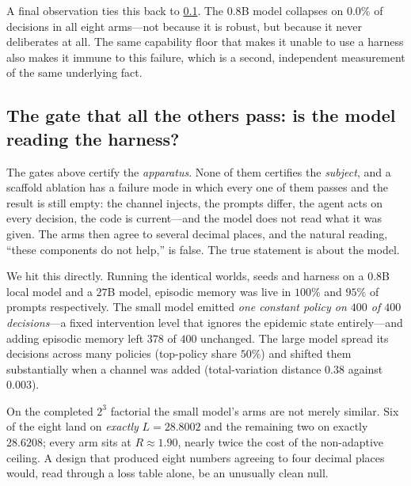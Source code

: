 \documentclass[11pt]{article}
\begin{document}
A final observation ties this back to \cref{sec:responsiveness}. The $0.8$B model collapses on
$0.0\%$ of decisions in all eight arms---not because it is robust, but because it never deliberates
at all. The same capability floor that makes it unable to use a harness also makes it immune to this
failure, which is a second, independent measurement of the same underlying fact.

\subsection{The gate that all the others pass: is the model reading the harness?}
\label{sec:responsiveness}

The gates above certify the \emph{apparatus}. None of them certifies the \emph{subject}, and a
scaffold ablation has a failure mode in which every one of them passes and the result is still empty:
the channel injects, the prompts differ, the agent acts on every decision, the code is current---and
the model does not read what it was given. The arms then agree to several decimal places, and the
natural reading, ``these components do not help,'' is false. The true statement is about the model.

We hit this directly. Running the identical worlds, seeds and harness on a $0.8$B local model and a
$27$B model, episodic memory was live in $100\%$ and $95\%$ of prompts respectively. The small model
emitted \emph{one constant policy on $400$ of $400$ decisions}---a fixed intervention level that
ignores the epidemic state entirely---and adding episodic memory left $378$ of $400$ unchanged. The
large model spread its decisions across many policies (top-policy share $50\%$) and shifted them
substantially when a channel was added (total-variation distance $0.38$ against $0.003$).

On the completed $2^3$ factorial the small model's arms are not merely similar. Six of the eight land
on \emph{exactly} $L=28.8002$ and the remaining two on exactly $28.6208$; every arm sits at
$R \approx 1.90$, nearly twice the cost of the non-adaptive ceiling. A design that produced eight
numbers agreeing to four decimal places would, read through a loss table alone, be an unusually
clean null.
\end{document}
